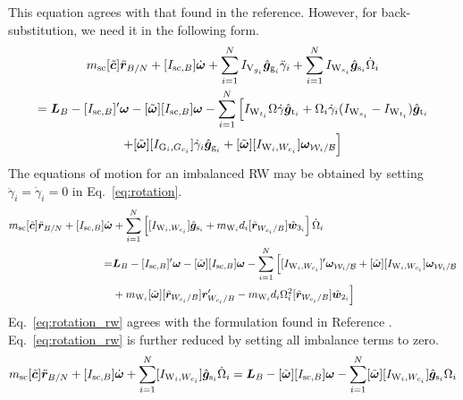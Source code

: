 This equation agrees with that found in the reference. However, for back-substitution, we need it in the following form.
\begin{multline}
m_{\text{\text{sc}}}[\tilde{\bm{c}}]\ddot{\bm r}_{B/N} + [I_{\text{sc},B}]\dot{\bm\omega}
+\sum\limits_{i=1}^{N}I_{\text{V}_{g_i}}\hat{\bm{g}}_{\text{g}_i} \ddot{\gamma}_i
+\sum\limits_{i=1}^{N}I_{\text{W}_{s_i}}\hat{\bm{g}}_{\text{s}_i} \dot{\Omega}_i
\\
= \bm{L}_B - [I_{\text{sc},B}]'\bm{\omega} - [\tilde{\bm\omega}][I_{\text{sc},B}]\bm\omega
-\sum\limits_{i=1}^{N} \Big[ 
I_{\text{W}_{t_i}}\Omega\dot{\gamma}\hat{\bm{g}}_{\text{t}_i} + \Omega_i\dot{\gamma}_i(I_{\text{W}_{s_i}}-I_{\text{W}_{t_i}})\hat{\bm{g}}_{\text{t}_i} \\+ [\tilde{\bm\omega}][I_{\text{G}_i,G_{c_i}}]\dot{\gamma}_i\hat{\bm{g}}_{\text{g}_i} + [\tilde{\bm{\omega}}][I_{\text{W}_i,W_{c_i}}]\bm{\omega}_{\mathcal{W}_i/\cal B}
\Big]
\label{eq:rotationsimpleBS}
\end{multline}
The equations of motion for an imbalanced RW may be obtained by setting $\ddot{\gamma}_i = \dot{\gamma}_i = 0$ in Eq.~\eqref{eq:rotation}.
\begin{equation}
	\begin{split}
		m_{\text{\text{sc}}}[\tilde{\bm{c}}]\ddot{\bm r}_{B/N} + [I_{\text{sc},B}]\dot{\bm\omega}&
		+\sum\limits_{i=1}^{N} \left[ [I_{\text{W}_i,W_{c_i}}]\hat{\bm{g}}_{\text{s}_i} + m_{\text{W}_i}d_i[\tilde{\bm{r}}_{W_{c_i}/B}]\hat{\bm w}_{3_i} \right] \dot{\Omega}_i
		\\
		=& \bm{L}_B - [I_{\text{sc},B}]'\bm{\omega} - [\tilde{\bm\omega}][I_{\text{sc},B}]\bm\omega
		-\sum\limits_{i=1}^{N} \Big[ 
		[I_{\text{W}_i,W_{c_i}}]'\bm{\omega}_{\mathcal{W}_i/\cal B} + [\tilde{\bm{\omega}}][I_{\text{W}_i,W_{c_i}}]\bm{\omega}_{\mathcal{W}_i/\cal B} \\&+ m_{\text{W}_i}[\tilde{\bm{\omega}}][\tilde{\bm{r}}_{W_{c_i}/B}]\bm{r}'_{W_{c_i}/B} - m_{\text{W}_i}d_i\Omega_i^2[\tilde{\bm{r}}_{W_{c_i}/B}]\hat{\bm{w}}_{2_i}
		\Big]
	\end{split}
	\label{eq:rotation_rw}
\end{equation}
Eq.~\eqref{eq:rotation_rw} agrees with the formulation found in Reference \cite{Alcorn:2016Jitter}. Eq.~\eqref{eq:rotation_rw} is further reduced by setting all imbalance terms to zero.
\begin{equation}
	m_{\text{\text{sc}}}[\tilde{\bm{c}}]\ddot{\bm r}_{B/N} + [I_{\text{sc},B}]\dot{\bm\omega}
	+\sum\limits_{i=1}^{N} [I_{\text{W}_i,W_{c_i}}]\hat{\bm{g}}_{\text{s}_i} \dot{\Omega}_i
	= \bm{L}_B - [\tilde{\bm\omega}][I_{\text{sc},B}]\bm\omega
	-\sum\limits_{i=1}^{N}[\tilde{\bm{\omega}}][I_{\text{W}_i,W_{c_i}}]\hat{\bm g}_{\text{s}_i}\Omega_i
	\label{eq:rwRotationSimple}
\end{equation}
